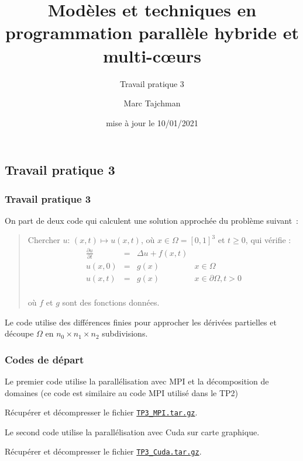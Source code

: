\documentclass{beamer}
\title{Modèles et techniques en programmation parallèle hybride et multi-c\oe urs}
\subtitle{Travail pratique 3}
\author{Marc Tajchman}\institute{CEA - DEN/DM2S/STMF/LMES}
\date{mise à jour le 10/01/2021}
\newcommand\Frac[2]{\frac{\displaystyle #1}{\displaystyle #2}}
\begin{document}
\begin{frame}
	\titlepage
\end{frame}

\large
\begin{frame}
	\section{Travail pratique 3}
	\frametitle{Travail pratique 3}

On part de deux code qui calculent une solution approchée du problème suivant~:

\medskip
\begin{quote}
Chercher $u$:  $(x, t) \mapsto u(x, t)$, où  $x \in \Omega = [0,1]^3$ et $t \geq 0$, qui vérifie :
$$
\begin{array}{lcll}
\Frac{\partial u}{\partial t} & = & \Delta u + f(x, t) & \\[0.3cm]
u(x, 0) &=& g(x) & x\in \Omega \\[0.3cm]
u(x, t) & = & g(x) & x\in\partial \Omega, t > 0\\[0.3cm]
\end{array}
$$

\vspace{-0.6cm}
où $f$ et $g$ sont des fonctions données.
\end{quote}

Le code utilise des différences finies pour approcher les dérivées partielles et découpe $\Omega$ en $n_0\times n_1\times n_2$ subdivisions.

\end{frame}

\begin{frame}
	\frametitle{Codes de départ}
	
   \vfill
	Le premier code utilise la parallélisation avec MPI et la décomposition de domaines
    (ce code est similaire au code MPI utilisé dans le TP2)
	
	\medskip
	
	Récupérer et décompresser le fichier \href{https://perso.ensta-paris.fr/~tajchman/Seance9/TP3_MPI.tar.gz}{\tt TP3\_MPI.tar.gz}.
	
   \vfill
    
    Le second code utilise la parallélisation avec Cuda sur carte graphique.
    
	\medskip
	
	Récupérer et décompresser le fichier \href{https://perso.ensta-paris.fr/~tajchman/Seance9/TP3_Cuda.tar.gz}{\tt TP3\_Cuda.tar.gz}.

   \vfill
\end{frame}
\end{document}
